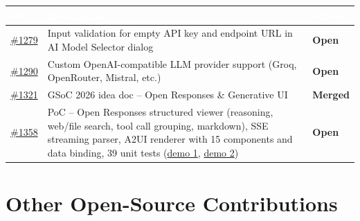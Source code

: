 \documentclass[11pt,a4paper]{article}
\begin{document}
\begin{center}
\begin{tabular}{|p{1.8cm}|p{9cm}|p{2cm}|}
\hline
\rowcolor{tblheader}
\textcolor{white}{\bfseries PR} & \textcolor{white}{\bfseries Description} & \textcolor{white}{\bfseries Status} \\
\hline
\rowcolor{tblrowwhite}
\href{https://github.com/foss42/apidash/pull/1279}{\#1279}
  & Input validation for empty API key and endpoint URL in AI Model Selector dialog
  & \textbf{Open} \\
\hline
\rowcolor{tblrowalt}
\href{https://github.com/foss42/apidash/pull/1290}{\#1290}
  & Custom OpenAI-compatible LLM provider support (Groq, OpenRouter, Mistral, etc.)
  & \textbf{Open} \\
\hline
\rowcolor{tblrowwhite}
\href{https://github.com/foss42/apidash/pull/1321}{\#1321}
  & GSoC 2026 idea doc -- Open Responses \& Generative UI
  & \textbf{Merged} \\
\hline
\rowcolor{tblrowalt}
\href{https://github.com/foss42/apidash/pull/1358}{\#1358}
  & PoC -- Open Responses structured viewer (reasoning, web/file search, tool call grouping, markdown), SSE streaming parser, A2UI renderer with 15 components and data binding, 39 unit tests
    (\href{https://youtu.be/paN-KGIhNms}{demo 1},
     \href{https://youtu.be/T2KbHth736U}{demo 2})
  & \textbf{Open} \\
\hline
\end{tabular}
\end{center}

\section{Other Open-Source Contributions}
\end{document}
